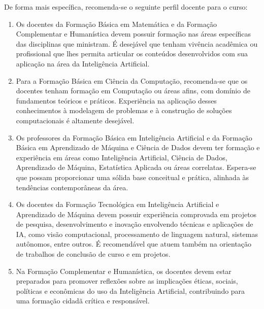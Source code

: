 De forma mais específica, recomenda-se o seguinte perfil docente para o curso:

\begin{enumerate}
    \item Os docentes da Formação Básica em Matemática e da Formação Complementar e Humanística devem possuir formação nas áreas específicas das disciplinas que ministram. É desejável que tenham vivência acadêmica ou profissional que lhes permita articular os conteúdos desenvolvidos com sua aplicação na área da Inteligência Artificial.

    \item Para a Formação Básica em Ciência da Computação, recomenda-se que os docentes tenham formação em Computação ou áreas afins, com domínio de fundamentos teóricos e práticos. Experiência na aplicação desses conhecimentos à modelagem de problemas e à construção de soluções computacionais é altamente desejável.

    \item Os professores da Formação Básica em Inteligência Artificial e da Formação Básica em Aprendizado de Máquina e Ciência de Dados devem ter formação e experiência em áreas como Inteligência Artificial, Ciência de Dados, Aprendizado de Máquina, Estatística Aplicada ou áreas correlatas. Espera-se que possam proporcionar uma sólida base conceitual e prática, alinhada às tendências contemporâneas da área.

    \item Os docentes da Formação Tecnológica em Inteligência Artificial e Aprendizado de Máquina devem possuir experiência comprovada em projetos de pesquisa, desenvolvimento e inovação envolvendo técnicas e aplicações de IA, como visão computacional, processamento de linguagem natural, sistemas autônomos, entre outros. É recomendável que atuem também na orientação de trabalhos de conclusão de curso e em projetos.

    \item Na Formação Complementar e Humanística, os docentes devem estar preparados para promover reflexões sobre as implicações éticas, sociais, políticas e econômicas do uso da Inteligência Artificial, contribuindo para uma formação cidadã crítica e responsável. %

\end{enumerate}


